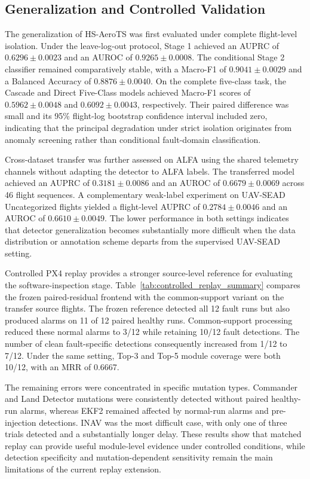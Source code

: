 \subsection{Generalization and Controlled Validation}
\label{sec:generalization_controlled_validation}

The generalization of HS-AeroTS was first evaluated under complete flight-level isolation. Under the leave-log-out protocol, Stage 1 achieved an AUPRC of $0.6296\pm0.0023$ and an AUROC of $0.9265\pm0.0008$. The conditional Stage 2 classifier remained comparatively stable, with a Macro-F1 of $0.9041\pm0.0029$ and a Balanced Accuracy of $0.8876\pm0.0040$. On the complete five-class task, the Cascade and Direct Five-Class models achieved Macro-F1 scores of $0.5962\pm0.0048$ and $0.6092\pm0.0043$, respectively. Their paired difference was small and its 95\% flight-log bootstrap confidence interval included zero, indicating that the principal degradation under strict isolation originates from anomaly screening rather than conditional fault-domain classification.

Cross-dataset transfer was further assessed on ALFA using the shared telemetry channels without adapting the detector to ALFA labels. The transferred model achieved an AUPRC of $0.3181\pm0.0086$ and an AUROC of $0.6679\pm0.0069$ across 46 flight sequences. A complementary weak-label experiment on UAV-SEAD Uncategorized flights yielded a flight-level AUPRC of $0.2784\pm0.0046$ and an AUROC of $0.6610\pm0.0049$. The lower performance in both settings indicates that detector generalization becomes substantially more difficult when the data distribution or annotation scheme departs from the supervised UAV-SEAD setting.

Controlled PX4 replay provides a stronger source-level reference for evaluating the software-inspection stage. Table~\ref{tab:controlled_replay_summary} compares the frozen paired-residual frontend with the common-support variant on the transfer source flights. The frozen reference detected all 12 fault runs but also produced alarms on 11 of 12 paired healthy runs. Common-support processing reduced these normal alarms to 3/12 while retaining 10/12 fault detections. The number of clean fault-specific detections consequently increased from 1/12 to 7/12. Under the same setting, Top-3 and Top-5 module coverage were both 10/12, with an MRR of 0.6667.

The remaining errors were concentrated in specific mutation types. Commander and Land Detector mutations were consistently detected without paired healthy-run alarms, whereas EKF2 remained affected by normal-run alarms and pre-injection detections. INAV was the most difficult case, with only one of three trials detected and a substantially longer delay. These results show that matched replay can provide useful module-level evidence under controlled conditions, while detection specificity and mutation-dependent sensitivity remain the main limitations of the current replay extension.

